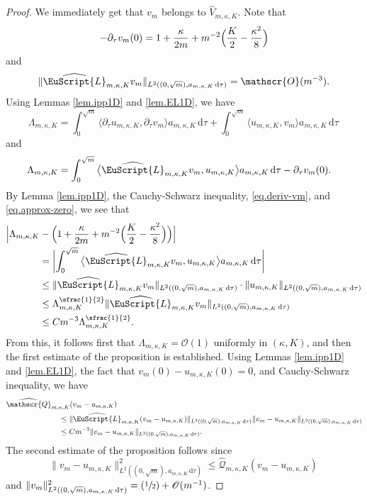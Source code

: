 \documentclass[10pt]{amsart}
\let\mathcal \EuScript
\newcommand{\Psfrac}[2]{(\sfrac{#1}{#2})}
\newcommand{\scrO}{\mathscr{O}}
\newcommand{\scrQ}{\mathscr{Q}}
\newcommand{\cL}{\mathcal{L}}
\theoremstyle{plain}
\theoremstyle{definition}
\newcommand{\dx}{\mathrm{\,d}}
\let\pa\partial
\begin{document}
\begin{proof}
We immediately get that $v_m$ belongs to $\widehat{V}_{m,\kappa,K}$. Note that
\begin{equation}\label{eq.deriv-vm}
-\partial_{\tau}v_{m}(0)=1 + \frac{\kappa}{2m} + m^{-2}\Bigl(
\frac{K}{2} - \frac{\kappa^2}{8}
\Bigr)
\end{equation}
and
\begin{equation}\label{eq.approx-zero}
\|\widehat{\cL}_{m,\kappa,K} v_m\|_{L^2((0,\sqrt{m}), a_{m,\kappa,K}\dx\tau)} = \scrO(m^{-3}).
\end{equation}
Using Lemmas \ref{lem.ipp1D} and \ref{lem.EL1D}, we have
\[ \Lambda_{m,\kappa,K}=
\int_0^{\sqrt{m}}\big\langle
\pa_\tau u_{m,\kappa,K},\pa_\tau v_m
\big\rangle a_{m,\kappa,K}\dx\tau
+
\int_0^{\sqrt{m}}\big\langle
u_{m,\kappa,K},v_m
\big\rangle a_{m,\kappa,K}\dx\tau\,
\]
and
\[\begin{split}
&
\Lambda_{m,\kappa,K}
=\int_0^{\sqrt{m}}\big\langle
\widehat{\cL}_{m,\kappa,K} v_m,u_{m,\kappa,K}
\big\rangle a_{m,\kappa,K}\dx\tau
-
\pa_\tau v_{m}(0).
\end{split}\]
By Lemma \ref{lem.ipp1D}, the Cauchy-Schwarz inequality, \eqref{eq.deriv-vm}, and \eqref{eq.approx-zero}, we see that
\[\begin{split}
\Bigl|\Lambda_{m,\kappa,K}&-\Bigl(
1 + \frac{\kappa}{2m} + m^{-2}\Bigl(
\frac{K}{2} - \frac{\kappa^2}{8}
\Bigr)
\Bigr)\Bigr|
\\
&= \biggl|
\int_0^{\sqrt{m}}\big\langle
\widehat{\cL}_{m,\kappa,K} v_m,
u_{m,\kappa,K}
\big\rangle a_{m,\kappa,K}\dx\tau
\biggr|
\\
&\leq
\|\widehat{\cL}_{m,\kappa,K} v_m\|_{L^2((0,\sqrt{m}), a_{m,\kappa,K}\dx\tau)}\cdot
\|u_{m,\kappa,K}\|_{L^2((0,\sqrt{m}), a_{m,\kappa,K}\dx\tau)}
\\
&\leq \Lambda_{m,\kappa, K}^{\sfrac{1}{2}} \|\widehat{\cL}_{m,\kappa,K} v_m\|_{L^2((0,\sqrt{m}), a_{m,\kappa,K}\dx\tau)} \\
&\leq Cm^{-3}\Lambda_{m,\kappa, K}^{\sfrac{1}{2}}.
\end{split}\]
From this, it follows first that $\Lambda_{m,\kappa,K}=\scrO(1)$ uniformly in $(\kappa, K)$, and then the first estimate of the proposition is established.
Using Lemmas \ref{lem.ipp1D} and \ref{lem.EL1D}, the fact that $v_{m}(0)-u_{m,\kappa,K}(0) = 0$, and Cauchy-Schwarz inequality, we have
\begin{align*}
\widehat{\scrQ}_{m,\kappa,K}&(v_{m}-u_{m,\kappa,K})\\
&\hspace*{-.5cm}\leq \|\widehat{\cL}_{m,\kappa,K} (v_m-u_{m,\kappa,K})\|_{L^2((0,\sqrt{m}), a_{m,\kappa,K}\dx\tau)}\|v_m-u_{m,\kappa,K}\|_{L^2((0,\sqrt{m}), a_{m,\kappa,K}\dx\tau)}\\
&\hspace*{-.5cm}\leq Cm^{-3}\|v_m-u_{m,\kappa,K}\|_{L^2((0,\sqrt{m}), a_{m,\kappa,K}\dx\tau)}.
\end{align*}
The second estimate of the proposition follows since
\[\|v_m-u_{m,\kappa,K}\|_{L^2((0,\sqrt{m}), a_{m,\kappa,K}\dx\tau)}^2\leq\widehat{\scrQ}_{m,\kappa,K}(v_{m}-u_{m,\kappa,K})\,\]
and $\|v_{m}\|_{L^2((0,\sqrt{m}), a_{m,\kappa,K}\dx\tau)}^2=\Psfrac{1}{2}+\scrO(m^{-1})$.
\end{proof}
\end{document}
